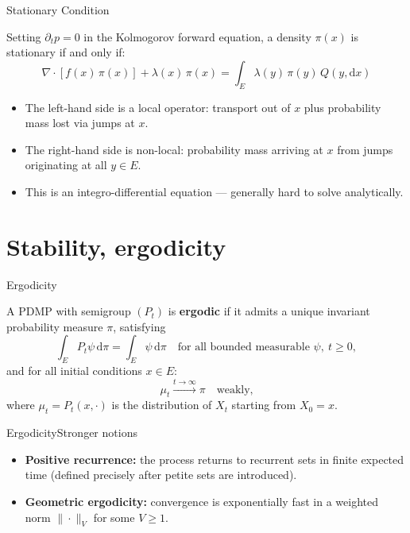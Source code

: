 \documentclass[aspectratio=169]{beamer}
\begin{document}
\begin{frame}{Stationary Condition}

  Setting $\partial_t p = 0$ in the Kolmogorov forward equation, a density
  $\pi(x)$ is stationary if and only if:
  \[
    \boxed{
      \nabla\cdot[f(x)\,\pi(x)] + \lambda(x)\,\pi(x)
      = \int_E \lambda(y)\,\pi(y)\,Q(y,\mathrm{d}x)
    }
  \]

  \bigskip
  \begin{itemize}
    \setlength\itemsep{8pt}
    \item The left-hand side is a local operator: transport out of $x$
          plus probability mass lost via jumps at $x$.
    \item The right-hand side is non-local: probability mass arriving
          at $x$ from jumps originating at all $y \in E$.
    \item This is an integro-differential equation --- generally hard
          to solve analytically.
  \end{itemize}

\end{frame}



\section{Stability, ergodicity}

\begin{frame}{Ergodicity}

  \begin{definition}
    A PDMP with semigroup $(P_t)$ is \textbf{ergodic} if it admits a
    unique invariant probability measure $\pi$, satisfying
    \[
      \int_E P_t \psi\,\mathrm{d}\pi = \int_E \psi\,\mathrm{d}\pi
      \quad \text{for all bounded measurable } \psi,\ t \geq 0,
    \]
    and for all initial conditions $x \in E$:
    \[
      \mu_t \xrightarrow{t\to\infty} \pi \quad \text{weakly,}
    \]
    where $\mu_t = P_t(x,\cdot)$ is the distribution of $X_t$
    starting from $X_0 = x$.
  \end{definition}

\end{frame}

\begin{frame}{Ergodicity}{Stronger notions}

    \begin{itemize}
      \item \textbf{Positive recurrence:} the process returns to
            recurrent sets in finite expected time (defined precisely
            after petite sets are introduced).
            \vfill
      \item \textbf{Geometric ergodicity:} convergence is exponentially
            fast in a weighted norm $\|\cdot\|_V$ for some $V \geq 1$.
    \end{itemize}

\end{frame}
\end{document}
